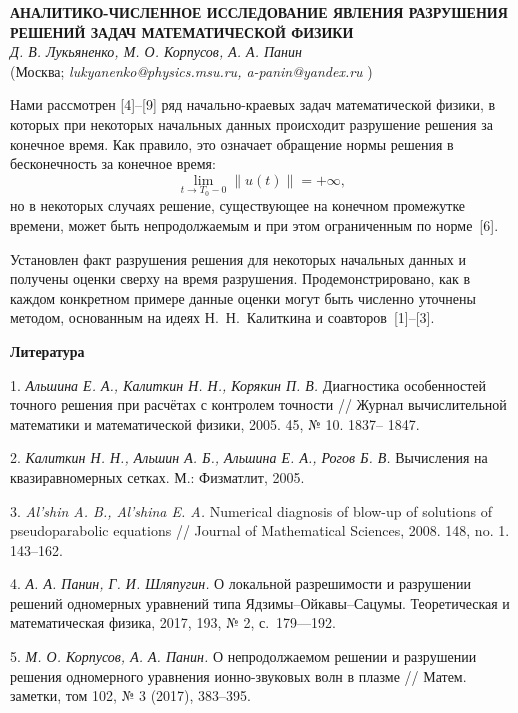 \begin{center}{ \bf  АНАЛИТИКО-ЧИСЛЕННОЕ ИССЛЕДОВАНИЕ ЯВЛЕНИЯ РАЗРУШЕНИЯ РЕШЕНИЙ ЗАДАЧ МАТЕМАТИЧЕСКОЙ ФИЗИКИ}\\
{\it Д. В. Лукьяненко, М. О. Корпусов, А. А. Панин } \\
(Москва; {\it lukyanenko@physics.msu.ru, a-panin@yandex.ru} )
\end{center}


Нами рассмотрен [4]--[9] ряд начально-краевых задач математической физики, в которых при некоторых начальных данных происходит разрушение решения за конечное время. Как правило, это означает обращение нормы решения в бесконечность за конечное время:
\begin{equation*}
\lim_{t\to T_0-0}\|u(t)\|=+\infty,
\end{equation*}
но в некоторых случаях решение, существующее на конечном промежутке времени, может быть непродолжаемым и при этом ограниченным по норме~[6].

Установлен факт разрушения решения для некоторых начальных данных и получены оценки сверху на время разрушения. Продемонстрировано, как в каждом конкретном примере данные оценки могут быть численно уточнены методом, основанным на идеях Н.~Н.~Калиткина и соавторов~[1]--[3].





\smallskip \centerline{\bf Литература}\nopagebreak

1. {\it Альшина Е. А., Калиткин Н. Н., Корякин П. В.} Диагностика особенностей точного решения при расчётах с
контролем точности // Журнал вычислительной математики и математической физики, 2005. 45, № 10. 1837–
1847.

2. {\it Калиткин Н. Н., Альшин А. Б., Альшина Е. А., Рогов Б. В.} Вычисления на квазиравномерных сетках. М.: Физматлит, 2005.

3. {\it Al’shin A. B., Al’shina E. A.} Numerical diagnosis of blow-up of solutions of pseudoparabolic equations // Journal of
Mathematical Sciences, 2008. 148, no. 1. 143–162.


4.	{\it А. А. Панин, Г. И. Шляпугин.} О локальной разрешимости и разрушении решений одномерных уравнений типа Ядзимы–Ойкавы–Сацумы. Теоретическая и математическая физика, 2017, 193, № 2, с.~179—192. {\sloppy


}

5.	{\it М. О. Корпусов, А. А. Панин.} О непродолжаемом решении и разрушении решения одномерного уравнения ионно-звуковых волн в плазме // Матем. заметки, том 102, № 3 (2017), 383–395.

